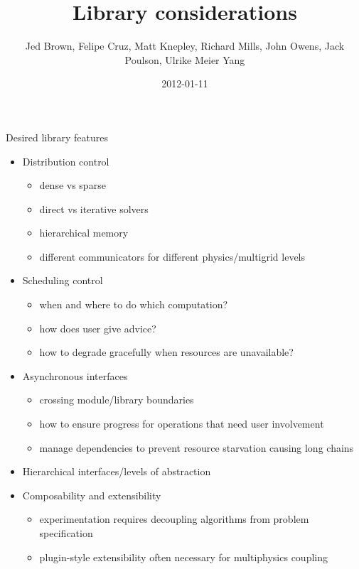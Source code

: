 \documentclass{beamer}
\title{Library considerations}
\author{Jed Brown, Felipe Cruz, Matt Knepley, Richard Mills, John Owens, Jack Poulson, Ulrike Meier Yang}
\date{2012-01-11}
\begin{document}
\lstset{language=C}
\normalem

\begin{frame}
  \titlepage
\end{frame}

\begin{frame}{Desired library features}
  \begin{itemize}
  \item Distribution control
    \begin{itemize}
    \item dense vs sparse
    \item direct vs iterative solvers
    \item hierarchical memory
    \item different communicators for different physics/multigrid levels
    \end{itemize}
  \item Scheduling control
    \begin{itemize}
    \item when and where to do which computation?
    \item how does user give advice?
    \item how to degrade gracefully when resources are unavailable?
    \end{itemize}
  \item Asynchronous interfaces
    \begin{itemize}
    \item crossing module/library boundaries
    \item how to ensure progress for operations that need user involvement
    \item manage dependencies to prevent resource starvation causing long chains
    \end{itemize}
  \item Hierarchical interfaces/levels of abstraction
  \item Composability and extensibility
    \begin{itemize}
    \item experimentation requires decoupling algorithms from problem specification
    \item plugin-style extensibility often necessary for multiphysics coupling
    \end{itemize}
  \end{itemize}
\end{frame}
\end{document}
